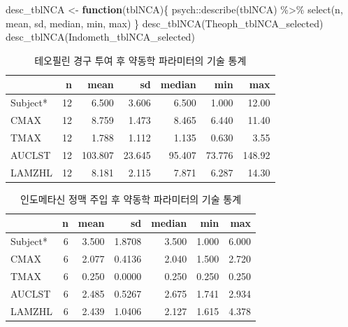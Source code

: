 \documentclass[
  11pt,
  krantz2, a4paper, twoside]{krantz}
\newenvironment{Shaded}{\begin{snugshade}}{\end{snugshade}}
\newcommand{\ControlFlowTok}[1]{\textcolor[rgb]{0.13,0.29,0.53}{\textbf{#1}}}
\newcommand{\FunctionTok}[1]{\textcolor[rgb]{0.00,0.00,0.00}{#1}}
\newcommand{\NormalTok}[1]{#1}
\newcommand{\OtherTok}[1]{\textcolor[rgb]{0.56,0.35,0.01}{#1}}
\newcommand{\SpecialCharTok}[1]{\textcolor[rgb]{0.00,0.00,0.00}{#1}}
\theoremstyle{definition}
\theoremstyle{definition}
\theoremstyle{definition}
\theoremstyle{definition}
\theoremstyle{remark}
\begin{document}
\begin{Shaded}
\begin{Highlighting}[]
\NormalTok{desc\_tblNCA }\OtherTok{\textless{}{-}} \ControlFlowTok{function}\NormalTok{(tblNCA)\{}
\NormalTok{  psych}\SpecialCharTok{::}\FunctionTok{describe}\NormalTok{(tblNCA) }\SpecialCharTok{\%\textgreater{}\%}
    \FunctionTok{select}\NormalTok{(n, mean, sd, median, min, max)}
\NormalTok{\}}
\FunctionTok{desc\_tblNCA}\NormalTok{(Theoph\_tblNCA\_selected)}
\FunctionTok{desc\_tblNCA}\NormalTok{(Indometh\_tblNCA\_selected)}
\end{Highlighting}
\end{Shaded}

\begin{table}

\caption{\label{tab:theodesc}테오필린 경구 투여 후 약동학 파라미터의 기술 통계}
\centering
\begin{tabular}[t]{lrrrrrr}
\toprule
  & n & mean & sd & median & min & max\\
\midrule
Subject* & 12 & 6.500 & 3.606 & 6.500 & 1.000 & 12.00\\
CMAX & 12 & 8.759 & 1.473 & 8.465 & 6.440 & 11.40\\
TMAX & 12 & 1.788 & 1.112 & 1.135 & 0.630 & 3.55\\
AUCLST & 12 & 103.807 & 23.645 & 95.407 & 73.776 & 148.92\\
LAMZHL & 12 & 8.181 & 2.115 & 7.871 & 6.287 & 14.30\\
\bottomrule
\end{tabular}
\end{table}

\begin{table}

\caption{\label{tab:indodesc}인도메타신 정맥 주입 후 약동학 파라미터의 기술 통계}
\centering
\begin{tabular}[t]{lrrrrrr}
\toprule
  & n & mean & sd & median & min & max\\
\midrule
Subject* & 6 & 3.500 & 1.8708 & 3.500 & 1.000 & 6.000\\
CMAX & 6 & 2.077 & 0.4136 & 2.040 & 1.500 & 2.720\\
TMAX & 6 & 0.250 & 0.0000 & 0.250 & 0.250 & 0.250\\
AUCLST & 6 & 2.485 & 0.5267 & 2.675 & 1.741 & 2.934\\
LAMZHL & 6 & 2.439 & 1.0406 & 2.127 & 1.615 & 4.378\\
\bottomrule
\end{tabular}
\end{table}
\end{document}

